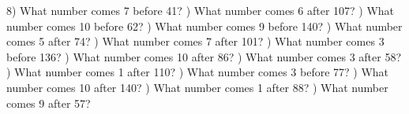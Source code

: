 \documentclass{article}%
\begin{document}
8) What number comes 7 before 41?%
\newline%
\newline%
) What number comes 6 after 107?%
\newline%
\newline%
) What number comes 10 before 62?%
\newline%
\newline%
) What number comes 9 before 140?%
\newline%
\newline%
) What number comes 5 after 74?%
\newline%
\newline%
) What number comes 7 after 101?%
\newline%
\newline%
) What number comes 3 before 136?%
\newline%
\newline%
) What number comes 10 after 86?%
\newline%
\newline%
) What number comes 3 after 58?%
\newline%
\newline%
) What number comes 1 after 110?%
\newline%
\newline%
) What number comes 3 before 77?%
\newline%
\newline%
) What number comes 10 after 140?%
\newline%
\newline%
) What number comes 1 after 88?%
\newline%
\newline%
) What number comes 9 after 57?%
\newline%
\newline%
\newline%
\end{document}
